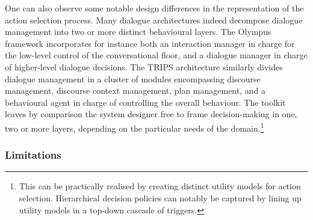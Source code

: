 One can also observe some notable design differences in the representation of the action selection process. Many dialogue architectures indeed decompose dialogue management into two or more distinct behavioural layers.  The Olympus framework incorporates for instance both an interaction manager in charge for the low-level control of the conversational floor, and a dialogue manager in charge of higher-level dialogue decisions.  The TRIPS architecture similarly divides dialogue management in a cluster of modules encompassing discourse management, discourse context management, plan management, and a behavioural agent in charge of controlling the overall behaviour. The \opendial toolkit leaves by comparison the system designer free to frame decision-making in one, two or more layers, depending on the particular needs of the domain.\footnote{This can be practically realised by creating distinct utility models for action selection.  Hierarchical decision policies can notably be captured by lining up utility models in a top-down cascade of triggers.}



\subsubsection*{Limitations}

